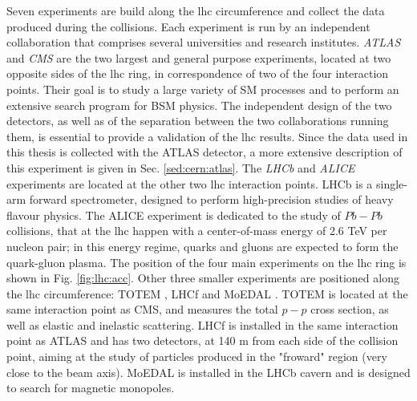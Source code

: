 Seven experiments are build along the \gls{lhc} circumference and collect the data produced during the collisions. Each experiment is run by an independent collaboration that comprises several universities and research institutes. 
\textit{ATLAS} \cite{atlas:atlas} and \textit{CMS} \cite{cms:cms} are the two largest and general purpose experiments, located at two opposite sides of the \gls{lhc} ring, in correspondence of two of the four interaction points. Their goal is to study a large variety of SM processes and to perform an extensive search program for BSM physics. The independent design of the two detectors, as well as of the separation between the two collaborations running them, is essential to provide a validation of the \gls{lhc} results. Since the data used in this thesis is collected with the ATLAS detector, a more extensive description of this experiment is given in Sec. \ref{sed:cern:atlas}. 
The \textit{LHCb} \cite{lhcb:lhcb} and \textit{ALICE} \cite{alice:alice} experiments are located at the other two \gls{lhc} interaction points. LHCb is a single-arm forward spectrometer, designed to perform high-precision studies of heavy flavour physics. The ALICE experiment is dedicated to the study of $Pb-Pb$ collisions, that at the \gls{lhc} happen with a center-of-mass energy of 2.6 TeV per nucleon pair; in this energy regime, quarks and gluons are expected to form the quark-gluon plasma.
The position of the four main experiments on the \gls{lhc} ring is shown in Fig. \ref{fig:lhc:acc}.
Other three smaller experiments are positioned along the \gls{lhc} circumference: TOTEM \cite{totem:totem}, LHCf \cite{lhcf:lhcf} and MoEDAL \cite{moedal:moedal}. TOTEM is located at the same interaction point as CMS, and measures the total $p-p$ cross section, as well as elastic and inelastic scattering. LHCf is installed in the same interaction point as ATLAS and has two detectors, at 140 m from each side of the collision point, aiming at the study of particles produced in the "froward" region (very close to the beam axis). MoEDAL is installed in the LHCb cavern and is designed to search for magnetic monopoles.  





